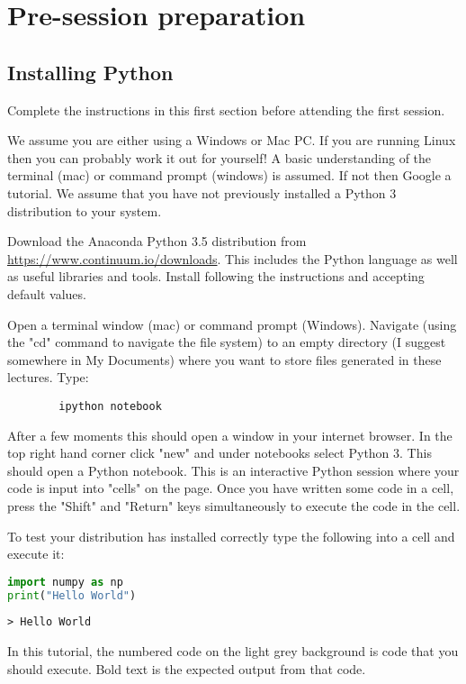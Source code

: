 \section{Pre-session preparation}
\subsection{Installing Python}
	Complete the instructions in this first section before attending the first session.
	
	We assume you are either using a Windows or Mac PC. If you are running Linux then you can probably work it out for yourself! A basic understanding of the terminal (mac) or command prompt (windows) is assumed. If not then Google a tutorial. We assume that you have not previously installed a Python 3 distribution to your system.
	
	Download the Anaconda Python 3.5 distribution from \url{https://www.continuum.io/downloads}. This includes the Python language as well as useful libraries and tools. Install following the instructions and accepting default values.

	Open a terminal window (mac) or command prompt (Windows). Navigate (using the "cd" command to navigate the file system) to an empty directory (I suggest somewhere in My Documents) where you want to store files generated in these lectures. Type:
	\begin{verbatim}
		ipython notebook
	\end{verbatim}

After a few moments this should open a window in your internet browser. In the top right hand corner click "new" and under notebooks select Python 3. This should open a Python notebook. This is an interactive Python session where your code is input into "cells" on the page. Once you have written some code in a cell, press the "Shift" and "Return" keys simultaneously to execute the code in the cell.

To test your distribution has installed correctly type the following into a cell and execute it:

		\begin{lstlisting}[language=Python]
import numpy as np
print("Hello World")\end{lstlisting}
		\begin{verbatim}> Hello World\end{verbatim}
		
In this tutorial, the numbered code on the light grey background is code that you should execute. Bold text is the expected output from that code.

